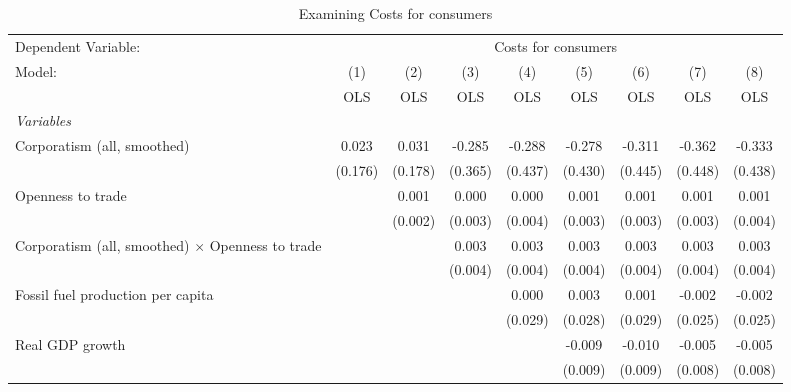 
\begin{table}[htbp]
   \caption{Examining Costs for consumers}
   \centering
   \begin{tabular}{lcccccccc}
      \toprule
      Dependent Variable: & \multicolumn{8}{c}{Costs for consumers}\\
      Model:                                                  & (1)     & (2)     & (3)     & (4)     & (5)     & (6)     & (7)     & (8)\\  
                                                              &  OLS    & OLS     & OLS     & OLS     & OLS     & OLS     & OLS     & OLS\\  
      \midrule
      \emph{Variables}\\
      Corporatism (all, smoothed)                             & 0.023   & 0.031   & -0.285  & -0.288  & -0.278  & -0.311  & -0.362  & -0.333\\   
                                                              & (0.176) & (0.178) & (0.365) & (0.437) & (0.430) & (0.445) & (0.448) & (0.438)\\   
      Openness to trade                                       &         & 0.001   & 0.000   & 0.000   & 0.001   & 0.001   & 0.001   & 0.001\\   
                                                              &         & (0.002) & (0.003) & (0.004) & (0.003) & (0.003) & (0.003) & (0.004)\\   
      Corporatism (all, smoothed) $\times$ Openness to trade  &         &         & 0.003   & 0.003   & 0.003   & 0.003   & 0.003   & 0.003\\   
                                                              &         &         & (0.004) & (0.004) & (0.004) & (0.004) & (0.004) & (0.004)\\   
      Fossil fuel production per capita                       &         &         &         & 0.000   & 0.003   & 0.001   & -0.002  & -0.002\\   
                                                              &         &         &         & (0.029) & (0.028) & (0.029) & (0.025) & (0.025)\\   
      Real GDP growth                                         &         &         &         &         & -0.009  & -0.010  & -0.005  & -0.005\\   
                                                              &         &         &         &         & (0.009) & (0.009) & (0.008) & (0.008)\\   

\end{tabular}
\end{table}

